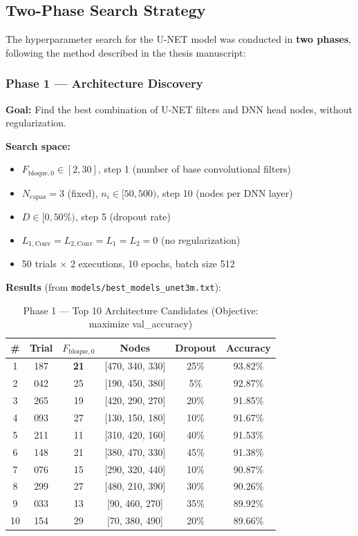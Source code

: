\documentclass[11pt,a4paper]{article}
\begin{document}
\subsection{Two-Phase Search Strategy}

The hyperparameter search for the U-NET model was conducted in \textbf{two phases}, following the method described in the thesis manuscript:

\subsubsection*{Phase 1 — Architecture Discovery}

\textbf{Goal:} Find the best combination of U-NET filters and DNN head nodes, without regularization.

\textbf{Search space:}
\begin{itemize}
    \item $F_{\text{bloque},0} \in [2, 30]$, step 1 (number of base convolutional filters)
    \item $N_{\text{capas}} = 3$ (fixed), $n_i \in [50, 500)$, step 10 (nodes per DNN layer)
    \item $D \in [0, 50\%)$, step 5 (dropout rate)
    \item $L_{1,\text{Conv}} = L_{2,\text{Conv}} = L_1 = L_2 = 0$ (no regularization)
    \item 50 trials $\times$ 2 executions, 10 epochs, batch size 512
\end{itemize}

\textbf{Results} (from \texttt{models/best\_models\_unet3m.txt}):

\begin{table}[H]
\centering
\caption{Phase 1 — Top 10 Architecture Candidates (Objective: maximize val\_accuracy)}
\begin{tabular}{cccccc}
\toprule
\textbf{\#} & \textbf{Trial} & $F_{\text{bloque},0}$ & \textbf{Nodes} & \textbf{Dropout} & \textbf{Accuracy} \\
\midrule
1 & 187 & \textbf{21} & [470, 340, 330] & 25\% & 93.82\% \\
2 & 042 & 25 & [190, 450, 380] & 5\%  & 92.87\% \\
3 & 265 & 19 & [420, 290, 270] & 20\% & 91.85\% \\
4 & 093 & 27 & [130, 150, 180] & 10\% & 91.67\% \\
5 & 211 & 11 & [310, 420, 160] & 40\% & 91.53\% \\
6 & 148 & 21 & [380, 470, 330] & 45\% & 91.38\% \\
7 & 076 & 15 & [290, 320, 440] & 10\% & 90.87\% \\
8 & 299 & 27 & [480, 210, 390] & 30\% & 90.26\% \\
9 & 033 & 13 & [90, 460, 270]  & 35\% & 89.92\% \\
10 & 154 & 29 & [70, 380, 490]  & 20\% & 89.66\% \\
\bottomrule
\end{tabular}
\end{table}
\end{document}
